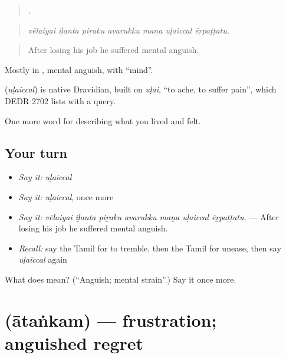 \begin{quote}
      .
\end{quote}

\begin{quote}
\emph{vēlaiyai iḻanta piṟaku avarukku maṉa uḷaiccal ēṟpaṭṭatu.}
\end{quote}

\begin{quote}
After losing his job he suffered mental anguish.
\end{quote}

Mostly in  , mental anguish, with  \textquotedblleft{}mind\textquotedblright{}.

\begin{cousinweb}
\textbf{} (\emph{uḷaiccal}) is native Dravidian, built on  \emph{uḷai}, \textquotedblleft{}to ache, to suffer pain\textquotedblright{}, which DEDR 2702 lists with a query.
\end{cousinweb}

\begin{grammarlens}[title={What you've built}]
One more word for describing what you lived and felt.
\end{grammarlens}

\subsection*{Your turn}
\begin{itemize}
\raggedright
  \item \emph{Say it:} \emph{uḷaiccal}
  \item \emph{Say it:} \emph{uḷaiccal}, once more
  \item \emph{Say it:} \emph{vēlaiyai iḻanta piṟaku avarukku maṉa uḷaiccal ēṟpaṭṭatu.} — After losing his job he suffered mental anguish.
  \item \emph{Recall:} say the Tamil for to tremble, then the Tamil for unease, then say \emph{uḷaiccal} again
\end{itemize}

\begin{tcolorbox}[breakable,colback=teal!4,colframe=teal!35!black,title={Before you move on}]
What does  mean? (\textquotedblleft{}Anguish; mental strain\textquotedblright{}.) Say it once more.
\end{tcolorbox}
\section[\texorpdfstring{\ta{ஆதங்கம்} (ātaṅkam)}{ஆதங்கம் (ātaṅkam)}]{ (ātaṅkam) — frustration; anguished regret}

